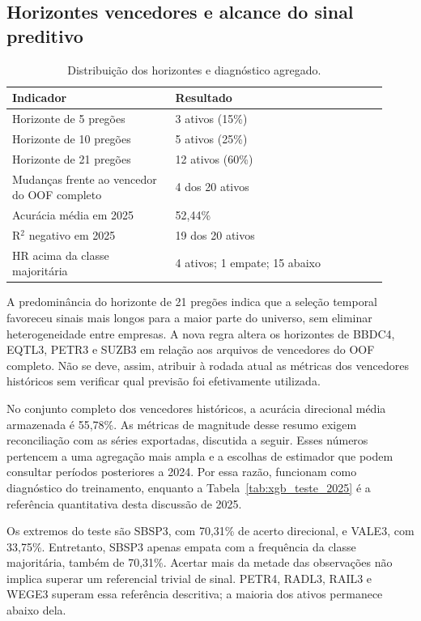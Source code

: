 \subsection*{Horizontes vencedores e alcance do sinal preditivo}
\begin{table}[H]
\centering
\caption{Distribuição dos horizontes e diagnóstico agregado.}
{\footnotesize
\begin{tabular}{p{0.40\linewidth}p{0.52\linewidth}}
\hline
Indicador & Resultado \\ \hline
Horizonte de 5 pregões & 3 ativos (15\%) \\
Horizonte de 10 pregões & 5 ativos (25\%) \\
Horizonte de 21 pregões & 12 ativos (60\%) \\
Mudanças frente ao vencedor do OOF completo & 4 dos 20 ativos \\
Acurácia média em 2025 & 52,44\% \\
R$^{2}$ negativo em 2025 & 19 dos 20 ativos \\
HR acima da classe majoritária & 4 ativos; 1 empate; 15 abaixo \\
\hline
\end{tabular}}
\par{}
\end{table}
A predominância do horizonte de 21 pregões indica que a seleção temporal favoreceu sinais mais longos para a maior parte do universo, sem eliminar heterogeneidade entre empresas. A nova regra altera os horizontes de BBDC4, EQTL3, PETR3 e SUZB3 em relação aos arquivos de vencedores do OOF completo. Não se deve, assim, atribuir à rodada atual as métricas dos vencedores históricos sem verificar qual previsão foi efetivamente utilizada.

No conjunto completo dos vencedores históricos, a acurácia direcional média armazenada é 55,78\%. As métricas de magnitude desse resumo exigem reconciliação com as séries exportadas, discutida a seguir. Esses números pertencem a uma agregação mais ampla e a escolhas de estimador que podem consultar períodos posteriores a 2024. Por essa razão, funcionam como diagnóstico do treinamento, enquanto a Tabela~\ref{tab:xgb_teste_2025} é a referência quantitativa desta discussão de 2025.

Os extremos do teste são SBSP3, com 70,31\% de acerto direcional, e VALE3, com 33,75\%. Entretanto, SBSP3 apenas empata com a frequência da classe majoritária, também de 70,31\%. Acertar mais da metade das observações não implica superar um referencial trivial de sinal. PETR4, RADL3, RAIL3 e WEGE3 superam essa referência descritiva; a maioria dos ativos permanece abaixo dela.

